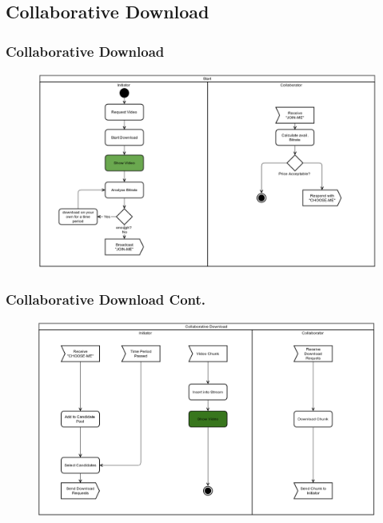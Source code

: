 \documentclass{beamer} %
\begin{document}
\subsection{Collaborative Download}
\begin{frame}
\frametitle{Collaborative Download}
\begin{figure}[hbtp]
\centering
\includegraphics[scale=.4]{figures/Workflow_1.png}
\end{figure}
\end{frame}

\begin{frame}
\frametitle{Collaborative Download Cont.}
\begin{figure}[hbtp]
\centering
\includegraphics[scale=.4]{figures/Workflow_2.png}
\end{figure}
\end{frame}
\end{document}
